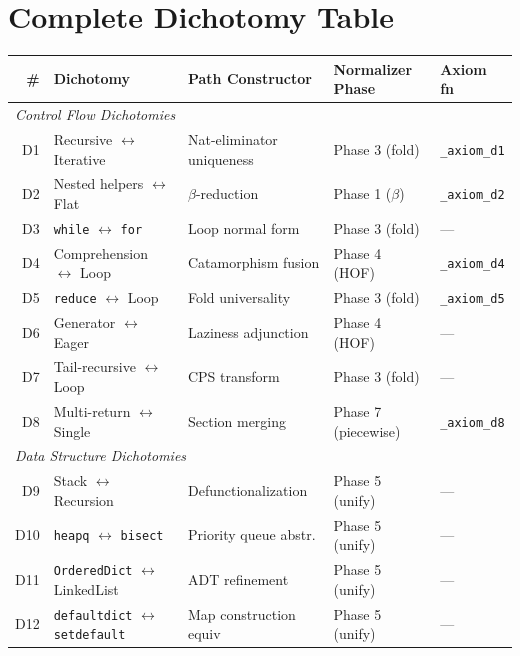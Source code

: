 \documentclass[11pt,a4paper]{report}
\theoremstyle{definition}
\theoremstyle{plain}
\begin{document}
\section{Complete Dichotomy Table}

\begin{longtable}{r p{3.5cm} p{3.5cm} p{3.0cm} p{2.2cm}}
  \toprule
  \textbf{\#} & \textbf{Dichotomy} & \textbf{Path Constructor} &
  \textbf{Normalizer Phase} & \textbf{Axiom fn} \\
  \midrule
  \endhead
  \multicolumn{5}{l}{\emph{Control Flow Dichotomies}} \\
  \midrule
  D1 & Recursive $\leftrightarrow$ Iterative &
    Nat-eliminator uniqueness &
    Phase 3 (fold) &
    \texttt{\_axiom\_d1} \\
  D2 & Nested helpers $\leftrightarrow$ Flat &
    $\beta$-reduction &
    Phase 1 ($\beta$) &
    \texttt{\_axiom\_d2} \\
  D3 & \texttt{while} $\leftrightarrow$ \texttt{for} &
    Loop normal form &
    Phase 3 (fold) &
    --- \\
  D4 & Comprehension $\leftrightarrow$ Loop &
    Catamorphism fusion &
    Phase 4 (HOF) &
    \texttt{\_axiom\_d4} \\
  D5 & \texttt{reduce} $\leftrightarrow$ Loop &
    Fold universality &
    Phase 3 (fold) &
    \texttt{\_axiom\_d5} \\
  D6 & Generator $\leftrightarrow$ Eager &
    Laziness adjunction &
    Phase 4 (HOF) &
    --- \\
  D7 & Tail-recursive $\leftrightarrow$ Loop &
    CPS transform &
    Phase 3 (fold) &
    --- \\
  D8 & Multi-return $\leftrightarrow$ Single &
    Section merging &
    Phase 7 (piecewise) &
    \texttt{\_axiom\_d8} \\
  \midrule
  \multicolumn{5}{l}{\emph{Data Structure Dichotomies}} \\
  \midrule
  D9 & Stack $\leftrightarrow$ Recursion &
    Defunctionalization &
    Phase 5 (unify) &
    --- \\
  D10 & \texttt{heapq} $\leftrightarrow$ \texttt{bisect} &
    Priority queue abstr. &
    Phase 5 (unify) &
    --- \\
  D11 & \texttt{OrderedDict} $\leftrightarrow$ LinkedList &
    ADT refinement &
    Phase 5 (unify) &
    --- \\
  D12 & \texttt{defaultdict} $\leftrightarrow$ \texttt{setdefault} &
    Map construction equiv &
    Phase 5 (unify) &
    --- \\

\end{longtable}
\end{document}
